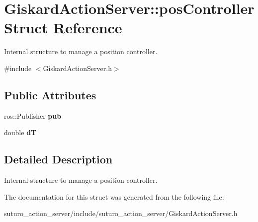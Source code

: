 \hypertarget{structGiskardActionServer_1_1posController}{\section{Giskard\-Action\-Server\-:\-:pos\-Controller Struct Reference}
\label{structGiskardActionServer_1_1posController}
}


Internal structure to manage a position controller.  




{\ttfamily \#include $<$Giskard\-Action\-Server.\-h$>$}

\subsection*{Public Attributes}
\begin{DoxyCompactItemize}
\item 
\hypertarget{structGiskardActionServer_1_1posController_a125f1b93bb1a04f498428ce9b906df79}{ros\-::\-Publisher {\bfseries pub}}\label{structGiskardActionServer_1_1posController_a125f1b93bb1a04f498428ce9b906df79}

\item 
\hypertarget{structGiskardActionServer_1_1posController_a78d355a544b03b7e018fc9c1b13273bc}{double {\bfseries d\-T}}\label{structGiskardActionServer_1_1posController_a78d355a544b03b7e018fc9c1b13273bc}

\end{DoxyCompactItemize}


\subsection{Detailed Description}
Internal structure to manage a position controller. 

The documentation for this struct was generated from the following file\-:\begin{DoxyCompactItemize}
\item 
suturo\-\_\-action\-\_\-server/include/suturo\-\_\-action\-\_\-server/Giskard\-Action\-Server.\-h\end{DoxyCompactItemize}
